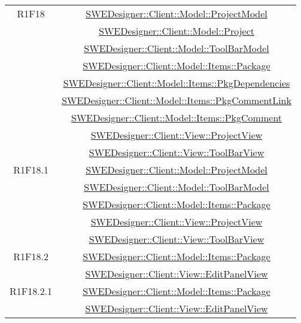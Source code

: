 \documentclass[../DefinizioneDiProdotto.tex]{subfiles}
\begin{document}
\begin{longtable}{|c|c|}
				R1F18
				& \hyperlink{SWEDesigner::Client::Model::ProjectModel}{SWEDesigner::Client::Model::ProjectModel}\\
				& \hyperlink{SWEDesigner::Client::Model::Project}{SWEDesigner::Client::Model::Project}\\
				& \hyperlink{SWEDesigner::Client::Model::ToolBarModel}{SWEDesigner::Client::Model::ToolBarModel}\\
				& \hyperlink{SWEDesigner::Client::Model::Items::Package}{SWEDesigner::Client::Model::Items::Package}\\
				& \hyperlink{SWEDesigner::Client::Model::Items::PkgDependencies}{SWEDesigner::Client::Model::Items::PkgDependencies}\\
				& \hyperlink{SWEDesigner::Client::Model::Items::PkgCommentLink}{SWEDesigner::Client::Model::Items::PkgCommentLink}\\
				& \hyperlink{SWEDesigner::Client::Model::Items::PkgComment}{SWEDesigner::Client::Model::Items::PkgComment}\\
				& \hyperlink{SWEDesigner::Client::View::ProjectView}{SWEDesigner::Client::View::ProjectView}\\
				& \hyperlink{SWEDesigner::Client::View::ToolBarView}{SWEDesigner::Client::View::ToolBarView}\\
				\hline

				R1F18.1
				& \hyperlink{SWEDesigner::Client::Model::ProjectModel}{SWEDesigner::Client::Model::ProjectModel}\\
				& \hyperlink{SWEDesigner::Client::Model::ToolBarModel}{SWEDesigner::Client::Model::ToolBarModel}\\
				& \hyperlink{SWEDesigner::Client::Model::Items::Package}{SWEDesigner::Client::Model::Items::Package}\\
				& \hyperlink{SWEDesigner::Client::View::ProjectView}{SWEDesigner::Client::View::ProjectView}\\
				& \hyperlink{SWEDesigner::Client::View::ToolBarView}{SWEDesigner::Client::View::ToolBarView}\\
				\hline

				R1F18.2
				& \hyperlink{SWEDesigner::Client::Model::Items::Package}{SWEDesigner::Client::Model::Items::Package}\\
				& \hyperlink{SWEDesigner::Client::View::EditPanelView}{SWEDesigner::Client::View::EditPanelView}\\
				\hline

				R1F18.2.1
				& \hyperlink{SWEDesigner::Client::Model::Items::Package}{SWEDesigner::Client::Model::Items::Package}\\
				& \hyperlink{SWEDesigner::Client::View::EditPanelView}{SWEDesigner::Client::View::EditPanelView}\\
				\hline


\end{longtable}
\end{document}
